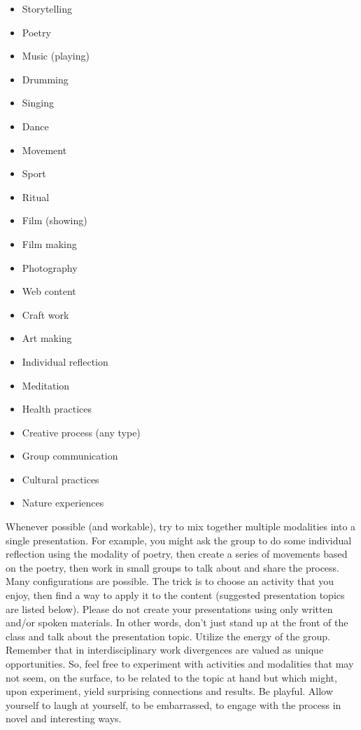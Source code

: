\documentclass[letterpaper,10pt,headsepline]{scrreprt}
\begin{document}
 \begin{itemize}
 \item Storytelling
 \item Poetry
 \item Music (playing)
 \item Drumming
 \item Singing
 \item Dance
 \item Movement
 \item Sport
 \item Ritual
 \item Film (showing)
 \item Film making
 \item Photography
 \item Web content
 \item Craft work
 \item Art making
 \item Individual reflection
 \item Meditation
 \item Health practices
 \item Creative process (any type)
 \item Group communication
 \item Cultural practices
 \item Nature experiences
 \end{itemize}

 Whenever possible (and workable), try to mix together multiple modalities into a single presentation. For example, you might ask the
 group to do some individual reflection using the modality of poetry,  then create a series of movements based on the poetry, then work in
 small groups to talk about and share the process. Many configurations are possible. The trick is to choose an activity that you enjoy, then
 find a way to apply it to the content (suggested presentation topics are listed below). Please do not create your presentations using only
 written and/or spoken materials. In other words, don't just stand up at the front of the class and talk about the presentation topic.
 Utilize the energy of the group. Remember that in interdisciplinary work divergences are valued as unique opportunities. So, feel free to
 experiment with activities and modalities that may not seem, on the surface, to be related to the topic at hand but which might, upon
 experiment, yield surprising connections and results. Be playful. Allow yourself to laugh at yourself, to be embarrassed, to engage
 with the process in novel and interesting ways.
\end{document}
